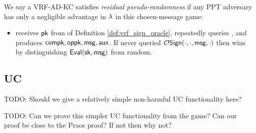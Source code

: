 \begin{definition}
We say a VRF-AD-KC satisfies {\em residual pseudo-randomness} if 
any PPT adversary \adv has only a negligible advantage in $\lambda$
in this chosen-message game:
\begin{itemize}
\item[]
  \adv receives $\mathsf{pk}$ from  of Definition \ref{def:vrf_sign_oracle},
  repeatedly queries , and produces $\mathsf{compk},\mathsf{oppk},\mathsf{msg},\mathsf{aux}$. 
  If \adv never queried $\mathcal{O}\mathsf{Sign}(\cdot,\cdot,\mathsf{msg},\cdot)$ then
  \adv wins by distinguishing ${\mathsf{Eval}}(\mathsf{sk},\mathsf{msg})$ from random.
\end{itemize}
\end{definition}
%












\subsection{UC}

TODO:  Should we give a relatively simple non-harmful UC functionality here?

TODO:  Can we prove this simpler UC functionality from the game?  Can our proof be close to the Praos proof?  If not then why not?









